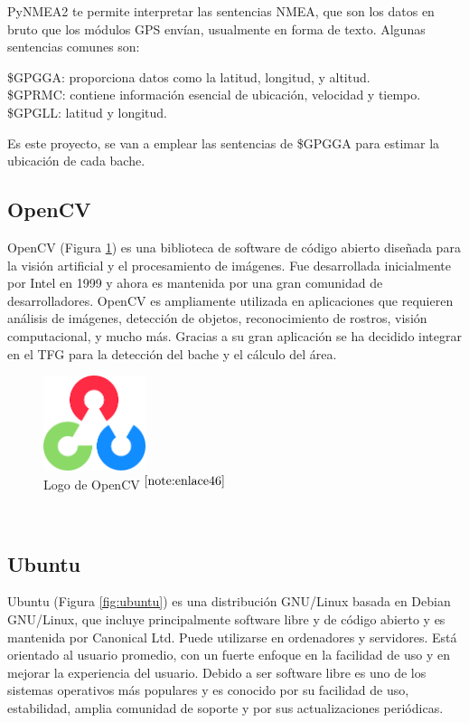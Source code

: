 PyNMEA2 te permite interpretar las sentencias NMEA, que son los datos en bruto que los módulos GPS envían, usualmente en forma de texto. Algunas sentencias comunes son:

\$GPGGA: proporciona datos como la latitud, longitud, y altitud.\\
\$GPRMC: contiene información esencial de ubicación, velocidad y tiempo.\\
\$GPGLL: latitud y longitud.

Es este proyecto, se van a emplear las sentencias de \$GPGGA para estimar la ubicación de cada bache.

\subsection{OpenCV}

OpenCV (Figura \ref{fig:opencv}) es una biblioteca de software de código abierto diseñada para la visión artificial y el procesamiento de imágenes. Fue desarrollada inicialmente por Intel en 1999 y ahora es mantenida por una gran comunidad de desarrolladores. OpenCV es ampliamente utilizada en aplicaciones que requieren análisis de imágenes, detección de objetos, reconocimiento de rostros, visión computacional, y mucho más. Gracias a su gran aplicación se ha decidido integrar en el TFG para la detección del bache y el cálculo del área.

\begin{figure} [h!]
	\begin{center}
		\includegraphics[width=3cm]{figs/opencv.png}
	\end{center}
	\caption{Logo de OpenCV $^{\ref{note:enlace46}}$} 
	\label{fig:opencv}
\end{figure}\

\setcounter{footnote}{46} %


\subsection{Ubuntu}

Ubuntu (Figura \ref{fig:ubuntu}) es una distribución GNU/Linux basada en Debian GNU/Linux, que incluye principalmente software libre y de código abierto y es mantenida por Canonical Ltd. Puede utilizarse en ordenadores y servidores. Está orientado al usuario promedio, con un fuerte enfoque en la facilidad de uso y en mejorar la experiencia del usuario. Debido a ser software libre es uno de los sistemas operativos más populares y es conocido por su facilidad de uso, estabilidad, amplia comunidad de soporte y por sus actualizaciones periódicas.

